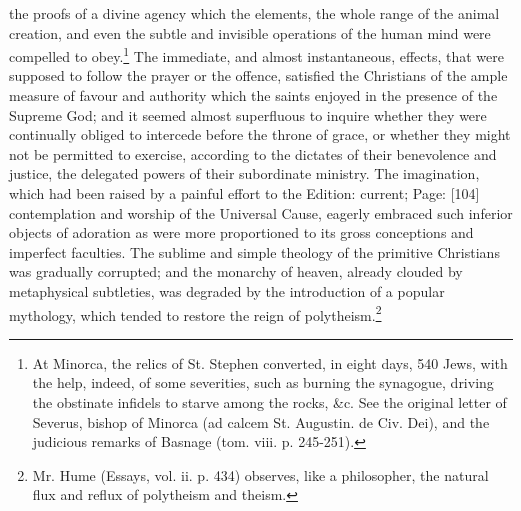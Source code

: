 the proofs of a divine agency which the elements, the whole range of the animal creation, and even the subtle and invisible operations of the human mind were compelled to obey.\footnote{At Minorca, the relics of St. Stephen converted, in eight days, 540 Jews, with the help, indeed, of some severities, such as burning the synagogue, driving the obstinate infidels to starve among the rocks, \&c. See the original letter of Severus, bishop of Minorca (ad calcem St. Augustin. de Civ. Dei), and the judicious remarks of Basnage (tom. viii. p. 245-251).} The immediate, and almost instantaneous, effects, that were supposed to follow the prayer or the offence, satisfied the Christians of the ample measure of favour and authority which the saints enjoyed in the presence of the Supreme God; and it seemed almost superfluous to inquire whether they were continually obliged to intercede before the throne of grace, or whether they might not be permitted to exercise, according to the dictates of their benevolence and justice, the delegated powers of their subordinate ministry. The imagination, which had been raised by a painful effort to the Edition: current; Page: [104] contemplation and worship of the Universal Cause, eagerly embraced such inferior objects of adoration as were more proportioned to its gross conceptions and imperfect faculties. The sublime and simple theology of the primitive Christians was gradually corrupted; and the monarchy of heaven, already clouded by metaphysical subtleties, was degraded by the introduction of a popular mythology, which tended to restore the reign of polytheism.\footnote{Mr. Hume (Essays, vol. ii. p. 434) observes, like a philosopher, the natural flux and reflux of polytheism and theism.}

